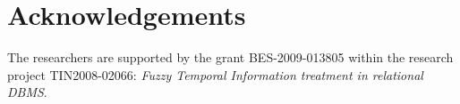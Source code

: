 \documentclass{llncs}
\begin{document}
% 
% 
% 
% 
% 









\newpage

\section*{Acknowledgements}
%
The researchers are supported by the grant BES-2009-013805 within the research project TIN2008-02066: \emph{Fuzzy Temporal Information treatment in relational DBMS}.



\end{document}
